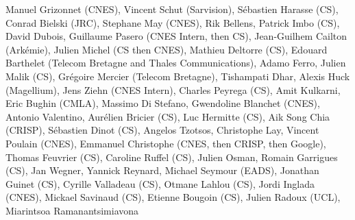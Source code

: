 Manuel Grizonnet (CNES), Vincent Schut (Sarvision), S\'ebastien Harasse (CS), Conrad Bielski (JRC), Stephane May (CNES), Rik Bellens, Patrick Imbo (CS), David Dubois, Guillaume Pasero (CNES Intern, then CS), Jean-Guilhem Cailton (Ark\'emie), Julien Michel (CS then CNES), Mathieu Deltorre (CS), Edouard Barthelet (Telecom Bretagne and Thales Communications), Adamo Ferro, Julien Malik (CS), Gr\'egoire Mercier (Telecom Bretagne), Tishampati Dhar, Alexis Huck (Magellium), Jens Ziehn (CNES Intern), Charles Peyrega (CS), Amit Kulkarni, Eric Bughin (CMLA), Massimo Di Stefano, Gwendoline Blanchet (CNES), Antonio Valentino, Aur\'elien Bricier (CS), Luc Hermitte (CS), Aik Song Chia (CRISP), S\'ebastien Dinot (CS), Angelos Tzotsos, Christophe Lay, Vincent Poulain (CNES), Emmanuel Christophe (CNES, then CRISP, then Google), Thomas Feuvrier (CS), Caroline Ruffel (CS), Julien Osman, Romain Garrigues (CS), Jan Wegner, Yannick Reynard, Michael Seymour (EADS), Jonathan Guinet (CS), Cyrille Valladeau (CS), Otmane Lahlou (CS), Jordi Inglada (CNES), Mickael Savinaud (CS), Etienne Bougoin (CS), Julien Radoux (UCL), Miarintsoa Ramanantsimiavona